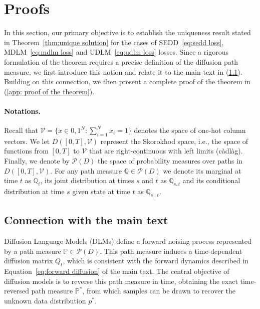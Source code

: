 \section{Proofs}
\label{app: proofs}
    In this section, our primary objective is to establish the uniqueness result stated in Theorem~\eqref{thm:unique solution} for the cases of SEDD~\eqref{eq:sedd loss}, MDLM~\eqref{eq:mdlm loss} and UDLM~\eqref{eq:udlm loss} losses. Since a rigorous formulation of the theorem requires a precise definition of the diffusion path measure, we first introduce this notion and relate it to the main text in (\wasyparagraph\ref{app: connection with the main text}). Building on this connection, we then present a complete proof of the theorem in (\wasyparagraph\ref{app: proof of the theorem}).
    
    \paragraph{Notations.} Recall that $\mathcal{V} = \{x \in {0,1}^N : \sum_{i=1}^N x_i = 1\}$ denotes the space of one-hot column vectors. We let $D([0, T], \mathcal{V})$ represent the Skorokhod space, i.e., the space of functions from $[0, T]$ to $\mathcal{V}$ that are right-continuous with left limits (càdlàg). Finally, we denote by $\mathcal{P}(D)$ the space of probability measures over paths in $D([0, T], \mathcal{V})$. For any path measure $\mathbb{Q} \in \mathcal{P}(D)$ we denote its marginal at time $t$ as $\mathbb{Q}_t$, its joint distribution at times $s$ and $t$ as $\mathbb{Q}_{s,t}$ and its conditional distribution at time $s$ given state at time $t$ as $\mathbb{Q}_{s\mid t}.$ 
    
    \subsection{Connection with the main text}
        \label{app: connection with the main text}
        Diffusion Language Models (DLMs) define a forward noising process represented by a path measure $\mathbb{P} \in \mathcal{P}(D)$. This path measure induces a time-dependent diffusion matrix $Q_t$, which is consistent with the forward dynamics described in Equation~\eqref{eq:forward diffusion} of the main text. The central objective of diffusion models is to reverse this path measure in time, obtaining the exact time-reversed path measure $\mathbb{P}^*$, from which samples can be drawn to recover the unknown data distribution $p^*$.

